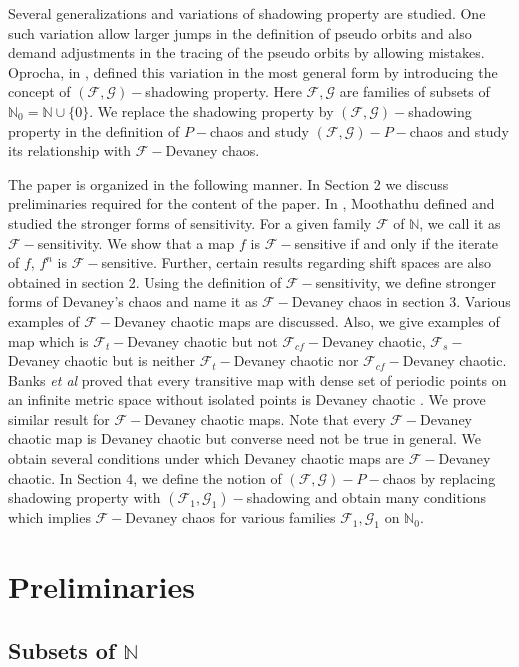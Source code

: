 \documentclass{amsart}[12pt, papera4]
\theoremstyle{definition}
\theoremstyle{remark}
\numberwithin{equation}{section}
\def\N{{\mathbb N}}
\def\F{{\mathscr{F}}}
\begin{document}
\medskip
\noindent Several generalizations and variations of shadowing property are studied. One such variation allow larger jumps in the definition of pseudo orbits and also demand adjustments in the tracing of the pseudo orbits by allowing mistakes. Oprocha, in \cite{Oprocha}, defined this variation in the most general form by introducing the concept of $(\mathscr{F}, \mathscr{G})-$shadowing property. Here $\mathscr{F}, \mathscr{G}$ are families of subsets of $\N_0=\N\cup \{0\}$. We replace the shadowing property by $\left(\mathscr{F}, \mathscr{G}\right)-$shadowing property in the definition of $P-$chaos and study $\left(\mathscr{F}, \mathscr{G}\right)-P-$chaos and study its relationship with $\F-$Devaney chaos.


\medskip
\noindent The paper is organized in the following manner. In Section 2 we discuss preliminaries required for the content of the paper. In \cite{TKS}, Moothathu defined and studied the stronger forms of sensitivity. For a given family $\F$ of $\N$, we call it as $\F-$sensitivity. We show that a map $f$ is $\F-$sensitive if and only if the iterate of $f$, $f^n$ is $\F-$sensitive. Further, certain results regarding shift spaces are also obtained in section 2.  Using the definition of $\F-$sensitivity, we define stronger forms of Devaney's chaos and name it as 
$\F-$Devaney chaos in section 3. Various examples of $\F-$Devaney chaotic maps are discussed. Also, we give examples of map which is $\F_t-$Devaney chaotic but not $\F_{cf}-$Devaney chaotic, $\F_s-$Devaney chaotic but is neither $\F_t-$Devaney chaotic nor $\F_{cf}-$Devaney chaotic. Banks \textit{et al} proved that every transitive map with dense set of periodic points on an infinite metric space without isolated points is Devaney chaotic \cite{Bank}. We prove similar result for  $\F-$Devaney chaotic maps. Note that every $\F-$Devaney chaotic map is Devaney chaotic but converse need not be true in general.  We obtain several conditions under which Devaney chaotic maps are $\F-$Devaney chaotic. In Section 4, we define the notion of $(\F, \mathscr{G})-P-$chaos by replacing shadowing property with $(\F_1,\mathscr{G}_1)-$shadowing and obtain many conditions which implies $\F-$Devaney chaos for various families $\F_1, \mathscr{G}_1$ on $\N_0$.


\section{Preliminaries}
\subsection{Subsets of $\N$}
\end{document}
